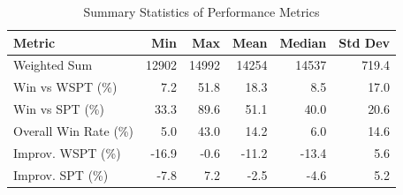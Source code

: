 \begin{table}[htbp]%
\centering%
\begin{tabular}{lrrrrr}%
\toprule%
\textbf{Metric}&\textbf{Min}&\textbf{Max}&\textbf{Mean}&\textbf{Median}&\textbf{Std Dev}\\%
\midrule%
Weighted Sum&12902&14992&14254&14537&719.4\\%
Win vs WSPT (\%)&7.2&51.8&18.3&8.5&17.0\\%
Win vs SPT (\%)&33.3&89.6&51.1&40.0&20.6\\%
Overall Win Rate (\%)&5.0&43.0&14.2&6.0&14.6\\%
Improv. WSPT (\%)&-16.9&-0.6&-11.2&-13.4&5.6\\%
Improv. SPT (\%)&-7.8&7.2&-2.5&-4.6&5.2\\%
\bottomrule%
\end{tabular}%
\caption{Summary Statistics of Performance Metrics}%
\label{tab:metrics}%
\end{table}